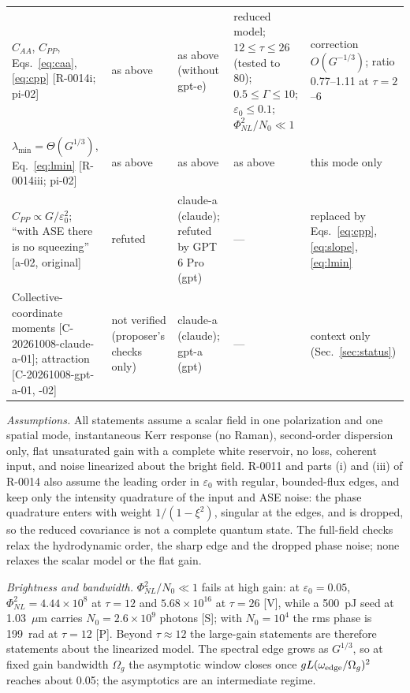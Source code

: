 \documentclass[aps,pra,twocolumn,superscriptaddress,nofootinbib,floatfix]{revtex4-2}
\newcommand{\PNL}{\Phi_{NL}}
\newcommand{\eps}{\varepsilon_0}
\newcommand{\rk}[1]{[\textsf{#1}]}
\begin{document}
\begin{table}[t]
\begin{ruledtabular}
\begin{tabular}{p{3.3cm}p{2.5cm}p{3.9cm}p{4.0cm}p{3.6cm}}
\raggedright $C_{AA}$, $C_{PP}$, Eqs.~\eqref{eq:caa}, \eqref{eq:cpp} [R-0014i; pi-02] & \raggedright as above & \raggedright as above (without gpt-e) & \raggedright reduced model; $12\le\tau\le26$ (tested to 80); $0.5\le\Gamma\le10$; $\eps\le0.1$; $\PNL^2/N_0\ll1$ & \raggedright correction $O(G^{-1/3})$; ratio 0.77--1.11 at $\tau=2$--6 \tabularnewline
\raggedright $\lambda_{\min}=\Theta(G^{1/3})$, Eq.~\eqref{eq:lmin} [R-0014iii; pi-02] & \raggedright as above & \raggedright as above & \raggedright as above & \raggedright this mode only \tabularnewline
\raggedright $C_{PP}\propto G/\eps^2$; ``with ASE there is no squeezing'' [a-02, original] & \raggedright refuted & \raggedright claude-a (claude); refuted by GPT 6 Pro (gpt) & \raggedright --- & \raggedright replaced by Eqs.~\eqref{eq:cpp}, \eqref{eq:slope}, \eqref{eq:lmin} \tabularnewline
\raggedright Collective-coordinate moments [C-20261008-claude-a-01]; attraction [C-20261008-gpt-a-01, -02] & \raggedright not verified (proposer's checks only) & \raggedright claude-a (claude); gpt-a (gpt) & \raggedright --- & \raggedright context only (Sec.~\ref{sec:status}) \tabularnewline
\end{tabular}
\end{ruledtabular}
\end{table}

\textit{Assumptions.} All statements assume a scalar field in one polarization and one spatial mode, instantaneous Kerr
response (no Raman), second-order dispersion only, flat unsaturated gain with a complete white reservoir, no loss,
coherent input, and noise linearized about the bright field. R-0011 and parts (i) and (iii) of R-0014 also assume the
leading order in $\eps$ with regular, bounded-flux edges, and keep only the intensity quadrature of the input and ASE
noise: the phase quadrature enters with weight $1/(1-\xi^2)$, singular at the edges, and is dropped, so the reduced
covariance is not a complete quantum state. The full-field checks relax the hydrodynamic order, the sharp edge and the
dropped phase noise; none relaxes the scalar model or the flat gain.

\textit{Brightness and bandwidth.} $\PNL^2/N_0\ll1$ fails at high gain: at $\eps=0.05$, $\PNL^2=4.44\times10^8$ at
$\tau=12$ and $5.68\times10^{16}$ at $\tau=26$ \rk{V}, while a 500~pJ seed at 1.03~$\mu$m carries $N_0=2.6\times10^9$
photons \rk{S}; with $N_0=10^4$ the rms phase is 199~rad at $\tau=12$ \rk{P}. Beyond $\tau\approx12$ the large-gain
statements are therefore statements about the linearized model. The spectral edge grows as $G^{1/3}$, so at fixed gain
bandwidth $\Omega_g$ the asymptotic window closes once $gL(\omega_{\rm edge}/\Omega_g)^2$ reaches about 0.05; the
asymptotics are an intermediate regime.
\end{document}
